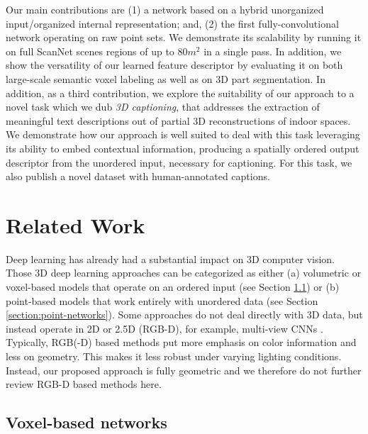 \documentclass[runningheads]{llncs}
\begin{document}
Our main contributions are (1) a network based on a hybrid unorganized input/organized internal representation; and, (2) the first fully-convolutional network operating on raw point sets. We demonstrate its scalability by running it on full ScanNet scenes regions of up to $80m^2$ in a single pass. In addition, we show the versatility of our learned feature descriptor by evaluating it on both large-scale semantic voxel labeling as well as on 3D part segmentation. In addition, as a third contribution, we explore the suitability of our approach to a novel task which we dub \textit{3D captioning}, that addresses the extraction of meaningful text descriptions out of partial 3D reconstructions of indoor spaces.
We demonstrate how our approach is well suited to deal with this task leveraging its ability to embed contextual information, producing a spatially ordered output descriptor from the unordered input, necessary for captioning. For this task, we also publish a novel dataset with human-annotated captions.


\section{Related Work}

Deep learning has already had a substantial impact on 3D computer vision. Those 3D deep learning approaches can be categorized as either (a) volumetric or voxel-based models that operate on an ordered input (see Section \ref{section:voxel-networks}) or (b) point-based models that work entirely with unordered data (see Section \ref{section:point-networks}).
Some approaches do not deal directly with 3D data, but instead operate in 2D or 2.5D (RGB-D), for example, multi-view CNNs \cite{Su2015,Qi2016,Kaiming2017}. Typically, RGB(-D) based methods put more emphasis on color information and less on geometry. This makes it less robust under varying lighting conditions. Instead, our proposed approach is fully geometric and we therefore do not further review RGB-D based methods here.


\subsection{Voxel-based networks}
\label{section:voxel-networks}
\end{document}
